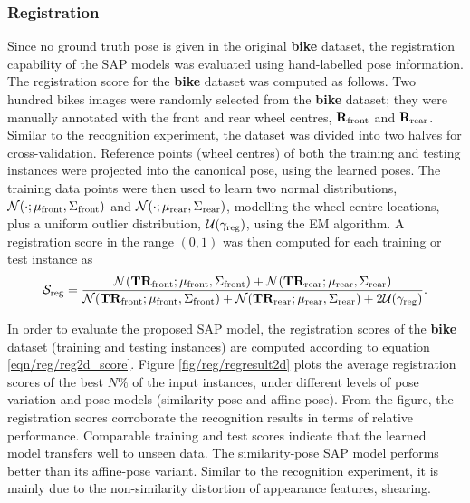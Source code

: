 \subsubsection{Registration} 
Since no ground truth pose is given in the original \textbf{bike} dataset, the registration capability of the SAP models was evaluated using hand-labelled pose information. 
The registration score for the \textbf{bike} dataset was computed as follows.
Two hundred bikes images were randomly selected from the \textbf{bike} dataset; they were manually annotated with the front and rear wheel centres, $\mathbf{R}_\mathrm{front}$ and $\mathbf{R}_\mathrm{rear}$.
Similar to the recognition experiment, the dataset was divided into two halves for cross-validation. 
Reference points (wheel centres) of both the training and testing instances were projected into the canonical pose, using the learned poses. The training data points were then used to learn two normal distributions, $\mathcal{N}(\cdot;\mu_\mathrm{front},\Sigma_\mathrm{front})$ and $\mathcal{N}(\cdot;\mu_\mathrm{rear},\Sigma_\mathrm{rear})$, modelling the wheel centre locations, plus a uniform outlier distribution, $\mathcal{U}(\gamma_\mathrm{reg})$, using the EM algorithm. A registration score in the range $(0,1)$ was then computed for each training or test instance as
\begin{equation}
	\mathcal{S}_\mathrm{reg} = \frac{\mathcal{N}(\mathbf{T}\mathbf{R}_\mathrm{front}; \mu_\mathrm{front},\Sigma_\mathrm{front}) + \mathcal{N}(\mathbf{T}\mathbf{R}_\mathrm{rear}; \mu_\mathrm{rear},\Sigma_\mathrm{rear})}{\mathcal{N}(\mathbf{T}\mathbf{R}_\mathrm{front}; \mu_\mathrm{front},\Sigma_\mathrm{front}) + \mathcal{N}(\mathbf{T}\mathbf{R}_\mathrm{rear}; \mu_\mathrm{rear},\Sigma_\mathrm{rear}) + 2\mathcal{U}(\gamma_\mathrm{reg})}.
	\label{eqn/reg/reg2d_score}
\end{equation}

In order to evaluate the proposed SAP model, the registration scores of the \textbf{bike} dataset (training and testing instances) are computed according to equation \ref{eqn/reg/reg2d_score}. Figure \ref{fig/reg/regresult2d} plots the average registration scores of the best $N\%$ of the input instances, under different levels of pose variation and pose models (similarity pose and affine pose). From the figure, the registration scores corroborate the recognition results in terms of relative performance. 
Comparable training and test scores indicate that the learned model transfers well to unseen data. The similarity-pose SAP model performs better than its affine-pose variant. Similar to the recognition experiment, it is mainly due to the non-similarity distortion of appearance features, \eg shearing. 

